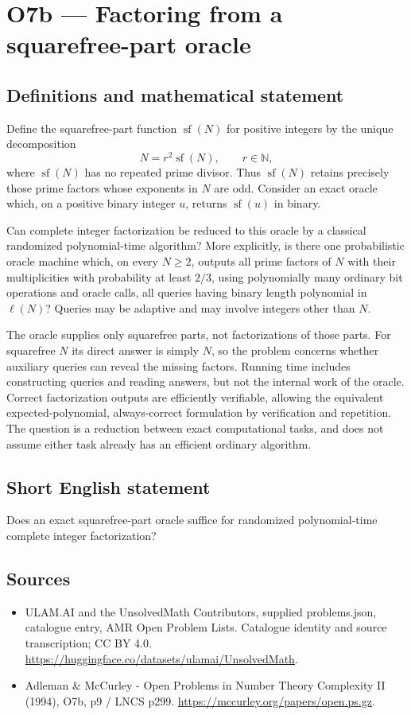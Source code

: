 \documentclass[11pt,a4paper]{article}
\begin{document}
\section*{O7b — Factoring from a squarefree-part oracle}\label{statement}

\subsection{Definitions and mathematical statement}
Define the squarefree-part function $\operatorname{sf}(N)$ for positive integers by the unique decomposition
\[
N=r^2\operatorname{sf}(N),\qquad r\in\mathbb N,
\]
where $\operatorname{sf}(N)$ has no repeated prime divisor. Thus $\operatorname{sf}(N)$ retains precisely those prime factors whose exponents in $N$ are odd. Consider an exact oracle which, on a positive binary integer $u$, returns $\operatorname{sf}(u)$ in binary.

Can complete integer factorization be reduced to this oracle by a classical randomized polynomial-time algorithm? More explicitly, is there one probabilistic oracle machine which, on every $N\ge2$, outputs all prime factors of $N$ with their multiplicities with probability at least $2/3$, using polynomially many ordinary bit operations and oracle calls, all queries having binary length polynomial in $\ell(N)$? Queries may be adaptive and may involve integers other than $N$.

The oracle supplies only squarefree parts, not factorizations of those parts. For squarefree $N$ its direct answer is simply $N$, so the problem concerns whether auxiliary queries can reveal the missing factors. Running time includes constructing queries and reading answers, but not the internal work of the oracle. Correct factorization outputs are efficiently verifiable, allowing the equivalent expected-polynomial, always-correct formulation by verification and repetition. The question is a reduction between exact computational tasks, and does not assume either task already has an efficient ordinary algorithm.
\subsection{Short English statement}
Does an exact squarefree-part oracle suffice for randomized polynomial-time complete integer factorization?
\subsection{Sources}
\begin{itemize}
\item[S1] ULAM.AI and the UnsolvedMath Contributors, supplied problems.json, catalogue entry, AMR Open Problem Lists. Catalogue identity and source transcription; CC BY 4.0.
\url{https://huggingface.co/datasets/ulamai/UnsolvedMath}.
\item[S2] Adleman \& McCurley - Open Problems in Number Theory Complexity II (1994), O7b, p9 / LNCS p299. 
\url{https://mccurley.org/papers/open.ps.gz}.
\end{itemize}
\end{document}
